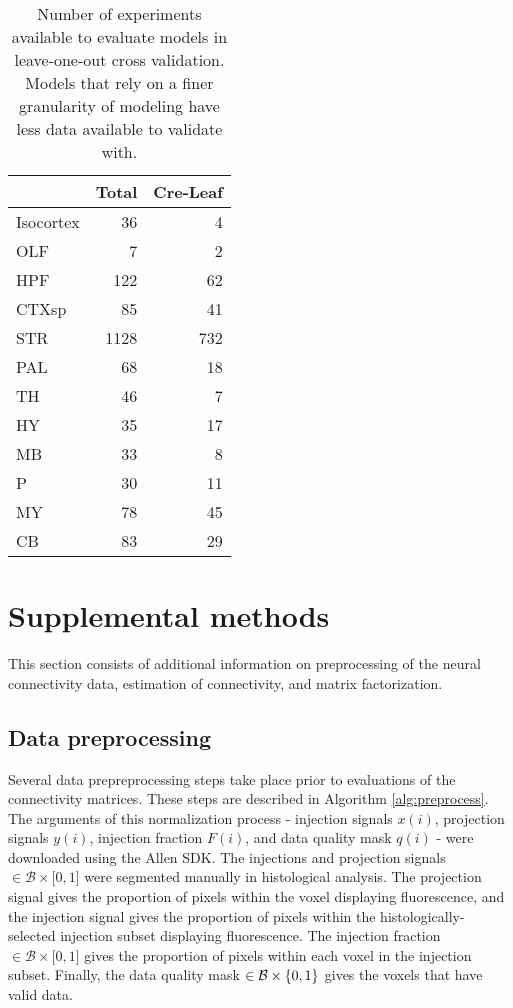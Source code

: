 \begin{table}[H]
\small
\begin{tabular}{lrr}
\toprule
{} &  Total &  Cre-Leaf \\
\midrule
Isocortex &     36 &         4 \\
OLF       &      7 &         2 \\
HPF       &    122 &        62 \\
CTXsp     &     85 &        41 \\
STR       &   1128 &       732 \\
PAL       &     68 &        18 \\
TH        &     46 &         7 \\
HY        &     35 &        17 \\
MB        &     33 &         8 \\
P         &     30 &        11 \\
MY        &     78 &        45 \\
CB        &     83 &        29 \\
\bottomrule
\end{tabular}
\caption{Number of experiments available to evaluate models in leave-one-out cross validation. 
Models that rely on a finer granularity of modeling have less data available to validate with.} 
\label{tab:eval_size}
\end{table}

\newpage 
\section{Supplemental methods}
\label{supp_sec:methods}

This section consists of additional information on preprocessing of the neural connectivity data, estimation of connectivity, and matrix factorization.

\subsection{Data preprocessing}
\label{supp_sec:dp}

Several data prepreprocessing steps take place prior to evaluations of the connectivity matrices.
These steps are described in Algorithm \ref{alg:preprocess}.
The arguments of this normalization process - injection signals $x(i)$, projection signals $y(i)$, injection fraction $F(i)$, and data quality mask $q(i)$ - were downloaded using the Allen SDK. %
The injections and projection signals $\in \mathcal B \times \mathbb [0,1]$ were segmented manually in histological analysis.
The projection signal gives the proportion of pixels within the voxel displaying fluorescence, and the injection signal gives the proportion of pixels within the histologically-selected injection subset displaying fluorescence.
The injection fraction $\in \mathcal B \times \mathbb [0,1]$ gives the proportion of pixels within each voxel in the injection subset.
Finally, the data quality mask $\in \mathcal B \times \mathbb \{0,1\}$ gives the voxels that have valid data.

